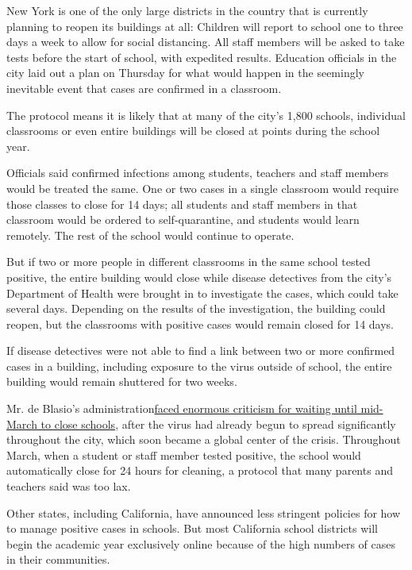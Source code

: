 New York is one of the only large districts in the country that is
currently planning to reopen its buildings at all: Children will report
to school one to three days a week to allow for social distancing. All
staff members will be asked to take tests before the start of school,
with expedited results. Education officials in the city laid out a plan
on Thursday for what would happen in the seemingly inevitable event that
cases are confirmed in a classroom.

The protocol means it is likely that at many of the city's 1,800
schools, individual classrooms or even entire buildings will be closed
at points during the school year.

Officials said confirmed infections among students, teachers and staff
members would be treated the same. One or two cases in a single
classroom would require those classes to close for 14 days; all students
and staff members in that classroom would be ordered to self-quarantine,
and students would learn remotely. The rest of the school would continue
to operate.

But if two or more people in different classrooms in the same school
tested positive, the entire building would close while disease
detectives from the city's Department of Health were brought in to
investigate the cases, which could take several days. Depending on the
results of the investigation, the building could reopen, but the
classrooms with positive cases would remain closed for 14 days.

If disease detectives were not able to find a link between two or more
confirmed cases in a building, including exposure to the virus outside
of school, the entire building would remain shuttered for two weeks.

Mr. de Blasio's
administration\href{https://www.nytimes.com/2020/07/06/nyregion/nyc-school-reopening-plan.html}{faced
enormous criticism for waiting until mid-March to close schools}, after
the virus had already begun to spread significantly throughout the city,
which soon became a global center of the crisis. Throughout March, when
a student or staff member tested positive, the school would
automatically close for 24 hours for cleaning, a protocol that many
parents and teachers said was too lax.

Other states, including California, have announced less stringent
policies for how to manage positive cases in schools. But most
California school districts will begin the academic year exclusively
online because of the high numbers of cases in their communities.

